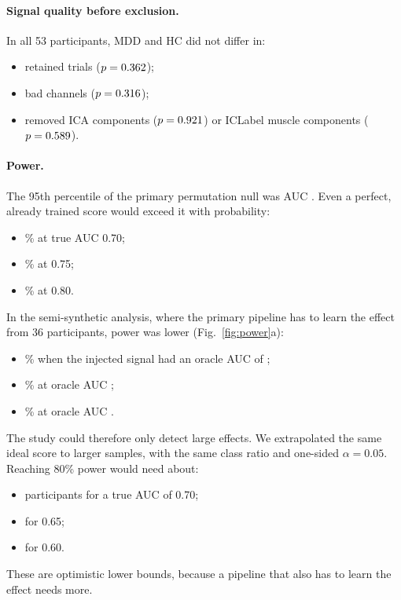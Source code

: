 \paragraph{Signal quality before exclusion.} In all 53 participants, MDD and HC did not differ in:
\begin{itemize}
  \item retained trials ($p=0.362$);
  \item bad channels ($p=0.316$);
  \item removed ICA components ($p=0.921$) or ICLabel muscle components ($p=0.589$).
\end{itemize}

\paragraph{Power.} The 95th percentile of the primary permutation null was AUC \AudPowThr. Even a perfect, already
trained score would exceed it with probability:
\begin{itemize}
  \item \AudPowIdealSeventy\% at true AUC 0.70;
  \item \AudPowIdealSeventyFive\% at 0.75;
  \item \AudPowIdealEighty\% at 0.80.
\end{itemize}
In the semi-synthetic analysis, where the primary pipeline has to learn the effect from 36 participants, power was
lower (Fig.~\ref{fig:power}a):
\begin{itemize}
  \item \AudSemiFivePower\% when the injected signal had an oracle AUC of \AudSemiFiveOracle;
  \item \AudSemiEightPower\% at oracle AUC \AudSemiEightOracle;
  \item \AudSemiTenPower\% at oracle AUC \AudSemiTenOracle.
\end{itemize}
The study could therefore only detect large effects. We extrapolated the same ideal score to larger samples, with
the same class ratio and one-sided $\alpha=0.05$. Reaching 80\% power would need about:
\begin{itemize}
  \item \AudNNeedSeventy{} participants for a true AUC of 0.70;
  \item \AudNNeedSixtyFive{} for 0.65;
  \item \AudNNeedSixty{} for 0.60.
\end{itemize}
These are optimistic lower bounds, because a pipeline that also has to learn the effect needs more.

